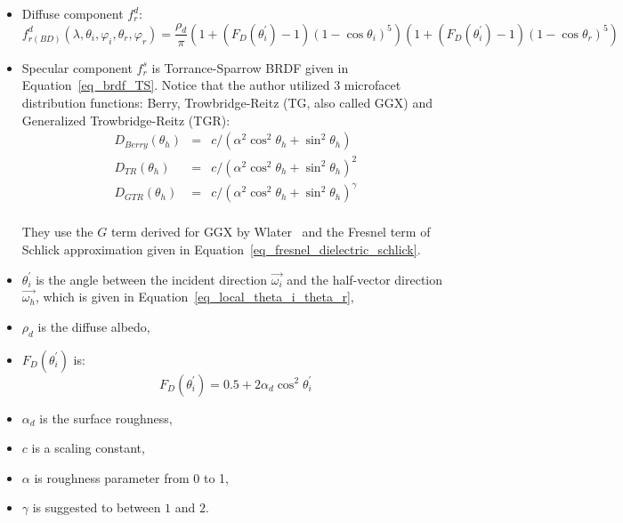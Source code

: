 \begin{itemize}
    \item Diffuse component $f_r^{d}$:
          \[
              f_{r(BD)}^{d}(\lambda, \theta_i, \varphi_i, \theta_r, \varphi_r) =
              \frac{\rho_d}{\pi}%
              (1 + (F_D(\theta_i^\prime) - 1)(1-\cos\theta_i)^5)%
              (1 + (F_D(\theta_i^\prime) - 1)(1- \cos\theta_r)^5)
          \]

    \item Specular component $f_r^{s}$ is Torrance-Sparrow BRDF given in Equation~\eqref{eq_brdf_TS}.
          Notice that the author utilized 3 microfacet distribution functions: Berry, Trowbridge-Reitz (TG, also called GGX) and Generalized Trowbridge-Reitz (TGR):
          \[
              \begin{array}{lll}
                  D_{Berry}(\theta_h) & = & c / (\alpha^2 \cos^2\theta_h + \sin^2\theta_h)          \\
                  D_{TR}(\theta_h)    & = & c / (\alpha^2 \cos^2\theta_h + \sin^2\theta_h)^2        \\
                  D_{GTR}(\theta_h)   & = & c / (\alpha^2 \cos^2\theta_h + \sin^2\theta_h)^{\gamma} \\
              \end{array}
          \]

          They use the $G$ term derived for GGX by Wlater~\cite{2007_Walter} and the Fresnel term of Schlick approximation given in Equation~\eqref{eq_fresnel_dielectric_schlick}.

    \item $\theta_i^\prime$ is the angle between the incident direction $\overrightarrow{\omega_i}$ and the half-vector direction $\overrightarrow{\omega_h}$, which is given in Equation~\eqref{eq_local_theta_i_theta_r},

    \item $\rho_d$ is the diffuse albedo,

    \item $F_D(\theta_i^\prime)$ is:
          \[
              F_D(\theta_i^\prime) = 0.5 + 2 \alpha_d \cos^2 \theta_i^\prime
          \]

    \item $\alpha_d$ is the surface roughness,

    \item $c$ is a scaling constant,

    \item $\alpha$ is roughness parameter from 0 to 1,

    \item $\gamma$ is suggested to between $1$ and $2$.

\end{itemize}

